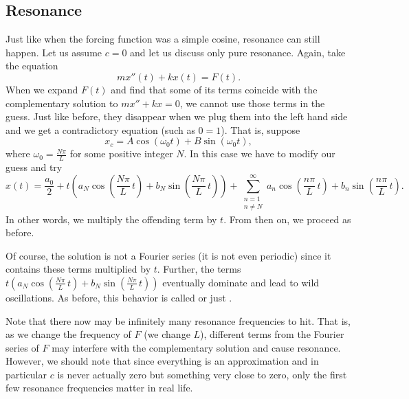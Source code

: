 \subsection{Resonance}

Just like when the forcing function was a simple cosine, resonance can still
happen.  Let us assume $c=0$ and let us discuss only pure resonance.
Again, take the equation
\begin{equation*}
m x''(t) + k x (t) = F(t) .
\end{equation*}
When we expand $F(t)$ and find that some of its terms coincide with the
complementary solution to $mx''+kx=0$, we cannot use those terms in the
guess.  Just like before, they disappear when we plug them into the left hand
side and we get a contradictory equation (such as $0=1$).   That is,
suppose
\begin{equation*}
x_c = A \cos (\omega_0 t) + B \sin (\omega_0 t), 
\end{equation*}
where $\omega_0 = \frac{N \pi}{L}$ for some positive integer $N$.
In this case we have
to modify our guess and try
\begin{equation*}
x(t) = \frac{a_0}{2} +
t \left(
a_N \cos \left( \frac{N \pi}{L}\, t \right) +
b_N \sin \left( \frac{N \pi}{L}\, t \right) \right) +
\sum_{\substack{n=1\\n\not= N}}^\infty
a_n \cos \left( \frac{n \pi}{L}\, t \right) +
b_n \sin \left( \frac{n \pi}{L} \, t \right) .
\end{equation*}
In other words, we multiply the offending term by $t$.  From then on, we
proceed as before.

Of course, the solution is not a Fourier series (it is not even
periodic) since it contains these terms multiplied by $t$.  Further, the
terms
$t \left( a_N \cos \left( \frac{N \pi}{L}\, t \right) +
b_N \sin \left( \frac{N \pi}{L}\, t \right) \right)$ eventually dominate and lead to
wild oscillations.  As before, this behavior is called \emph{} or just \emph{}.

Note that there now may be infinitely many resonance frequencies to hit.
That is, as we change the frequency of $F$ (we change $L$), different
terms from the Fourier series of $F$ may interfere with the complementary
solution and cause resonance.
However, we should note that since everything is an approximation and in
particular $c$ is never actually zero but something very close to zero,
only the first
few resonance frequencies matter in real life.

